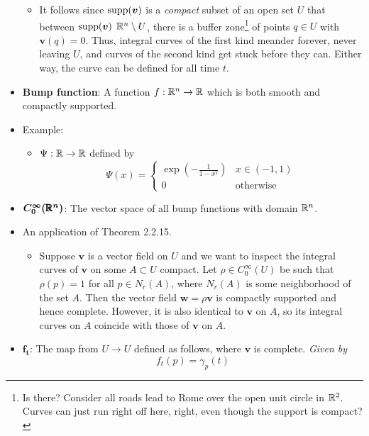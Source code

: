 \documentclass[../notes.tex]{subfiles}
\begin{document}
\begin{itemize}
\begin{itemize}
        \item It follows since $\operatorname{supp}(\bm{v})$ is a \emph{compact} subset of an open set $U$ that between $\operatorname{supp}(\bm{v})$ $\mathbb{R}^n\setminus U$, there is a buffer zone\footnote{Is there? Consider all roads lead to Rome over the open unit circle in $\mathbb{R}^2$. Curves can just run right off here, right, even though the support is compact?} of points $q\in U$ with $\bm{v}(q)=0$. Thus, integral curves of the first kind meander forever, never leaving $U$, and curves of the second kind get stuck before they can. Either way, the curve can be defined for all time $t$.
    \end{itemize}
    \item \textbf{Bump function}: A function $f:\mathbb{R}^n\to\mathbb{R}$ which is both smooth and compactly supported.
    \item Example:
    \begin{itemize}
        \item $\Psi:\mathbb{R}\to\mathbb{R}$ defined by
        \begin{equation*}
            \Psi(x) =
            \begin{cases}
                \exp(-\frac{1}{1-x^2}) & x\in(-1,1)\\
                0 & \text{otherwise}
            \end{cases}
        \end{equation*}
    \end{itemize}
    \item $\bm{C_0^\infty(\pmb{\mathbb{R}}^n)}$: The vector space of all bump functions with domain $\mathbb{R}^n$.
    \item An application of Theorem 2.2.15.
    \begin{itemize}
        \item Suppose $\bm{v}$ is a vector field on $U$ and we want to inspect the integral curves of $\bm{v}$ on some $A\subset U$ compact. Let $\rho\in C_0^\infty(U)$ be such that $\rho(p)=1$ for all $p\in N_r(A)$, where $N_r(A)$ is some neighborhood of the set $A$. Then the vector field $\bm{w}=\rho\bm{v}$ is compactly supported and hence complete. However, it is also identical to $\bm{v}$ on $A$, so its integral curves on $A$ coincide with those of $\bm{v}$ on $A$.
    \end{itemize}
    \item $\bm{f_t}$: The map from $U\to U$ defined as follows, where $\bm{v}$ is complete. \emph{Given by}
    \begin{equation*}
        f_t(p) = \gamma_p(t)
    \end{equation*}

\end{itemize}
\end{document}
